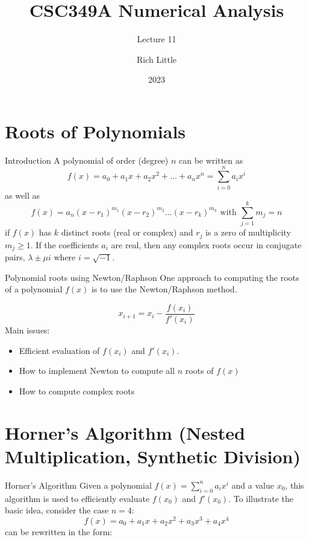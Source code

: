 \documentclass[12pt]{beamer}
\title[CSC349A Numerical Analysis]{CSC349A Numerical Analysis}
\subtitle[Lecture 11]{Lecture 11}
\date[2023]{2023}
\author[R. Little]{Rich Little}
\institute[University of Victoria]{University of Victoria}
\begin{document}
\frame{\maketitle} %




\section{Roots of Polynomials} 

\begin{frame}{Introduction} 
A polynomial of order (degree) $n$ can be written as 
\[
f(x) = a_0 + a_1 x + a_2 x^2 + \dots + a_n x^n = \sum_{i=0}^{n} a_i x^i
\] 
\noindent 
as well as
\[
f(x) = a_n (x - r_1)^{m_1}(x-r_2)^{m_2} \dots (x-r_k) ^{m_k}  \mbox{ with } \sum_{j=1}^{k} m_j = n 
\] 
\noindent 
if $f(x)$ has $k$ distinct roots (real or complex) and $r_j$ is a zero of multiplicity $m_j \geq 1$. If the coefficients $a_i$ are real, then any complex roots occur in conjugate pairs, $\lambda \pm \mu i$ where $i = \sqrt{-1}$. 
\end{frame} 


\begin{frame}{Polynomial roots using Newton/Raphson} 
One approach to computing the roots of a polynomial $f(x)$ is to use the Newton/Raphson method. 

\[
x_{i+1} = x_i - \frac{f(x_i)}{f'(x_i)} 
\]
\noindent 
Main issues: 
\begin{itemize} 
\item Efficient evaluation of $f(x_i)$ and $f'(x_i)$. 
\item How to implement Newton to compute all $n$ roots of $f(x)$ 
\item How to compute complex roots 
\end{itemize} 
\end{frame} 

\section{Horner's Algorithm (Nested Multiplication, Synthetic Division)} 

\begin{frame}{Horner's Algorithm} 
Given a polynomial $f(x) = \sum_{i=0}^{n} a_i x^{i}$ and a value $x_0$, this algorithm is used to efficiently evaluate $f(x_0)$ and $f'(x_0)$. To illustrate the basic idea, consider the case $n=4$: 
\begin{equation} 
  f(x) = a_0 + a_1 x + a_2 x^2 + a_3 x^3 + a_4x^4
\end{equation} 
\noindent 
can be rewritten in the form: 
\vspace{2 in}
\end{frame} 
\end{document}
